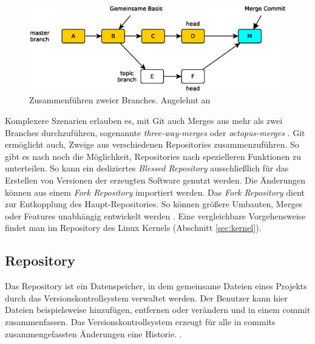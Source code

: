\begin{figure}[hb]
  \centering
  \includegraphics[scale=0.60]{images/merge.eps}
  \caption{Zusammenführen zweier Branches. Angelehnt an \cite[83]{gitosp}}
  \label{fig:merge}
\end{figure}

Komplexere Szenarien erlauben es, mit Git auch Merges aus mehr als zwei
Branches durchzuführen, sogenannte \textit{three-way-merges} oder
\textit{octopus-merges} \cite[S.~87]{gitosp}. Git ermöglicht auch, Zweige aus
verschiedenen Repositories zusammenzuführen. So gibt es nach \cite[3]{gitwf}
noch die Möglichkeit, Repositories nach spezielleren Funktionen zu unterteilen.
So kann ein dediziertes \textit{Blessed Repository} ausschließlich für das
Erstellen von Versionen der erzeugten Software genutzt werden. Die Änderungen
können aus einem \textit{Fork Repository} importiert werden. Das \textit{Fork
Repository} dient zur Entkopplung des Haupt-Repositories. So können größere
Umbauten, Merges oder Features unabhängig entwickelt werden
\cite[S.~123]{gitwf}. Eine vergleichbare Vorgehensweise findet man im
Repository des Linux Kernels \cite{link:linuxgit} (Abschnitt \ref{sec:kernel}).

\subsection{Repository}\label{sec:repository}
Das Repository ist ein Datenspeicher, in dem gemeinsame Dateien eines Projekts
durch das Versionskontrollsystem verwaltet werden. Der Benutzer kann hier Dateien
beispielsweise hinzufügen, entfernen oder verändern und in einem
\gls{commit} zusammenfassen. Das Versionskontrollsystem erzeugt für alle in
\glspl{commit} zusammengefassten Änderungen eine Historie.
 \cite[S.~38]{hagen:1678}.

